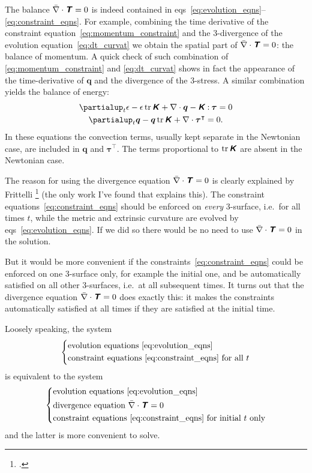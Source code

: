 \documentclass[\ifafour a4paper,12pt,\else a5paper,10pt,\fi%
onecolumn,oneside,article,%
british%
]{memoir}
\theoremstyle{remark}
\theoremstyle{innote}
\newcommand*{\mathte}[1]{\textbf{\textit{\textsf{#1}}}}
\newcommand*{\citey}{\footcites}%
\newcommand*{\de}{\partialup}%
\DeclareMathOperator{\tr}{tr}%
\newcommand*{\con}{\mathbin{:}}%
\renewcommand*{\|}[1][]{\nonscript\,#1\vert\nonscript\;\mathopen{}}
\newcommand*{\eqns}{eqs}%
\newcommand*{\ie}{{i.e.}}
\newcommand*{\T}{^\intercal}%
\newcommand*{\yTT}{\tau}
\newcommand*{\yT}{\bm{\yTT}}
\newcommand*{\yTTf}{T}
\newcommand*{\yTf}{\mathte{\yTTf}}
\newcommand*{\yKK}{K}
\newcommand*{\yK}{\mathte{\yKK}}
\newcommand*{\ypp}{q}
\newcommand*{\yp}{\bm{\ypp}}
\newcommand*{\ye}{\epsilon}
\newcommand*{\ynab}{\nabla}
\newcommand*{\ynaf}{\Bar{\nabla}}
\begin{document}
The balance $\ynaf\cdot\yTf = 0$ is indeed contained in
\eqns~\eqref{eq:evolution_eqns}--\eqref{eq:constraint_eqns}. For example,
combining the time derivative of the constraint
equation~\eqref{eq:momentum_constraint} and the 3-divergence of the
evolution equation~\eqref{eq:dt_curvat} we obtain the spatial part of
$\ynaf\cdot\yTf = 0$: the balance of momentum. A quick check of such
combination of \eqref{eq:momentum_constraint} and \eqref{eq:dt_curvat}
shows in fact the appearance of the time-derivative of $\yp$ and the
divergence of the 3-stress. A similar combination yields the balance of
energy:
\begin{subequations}\label{eq:evolution_energy_momentum}
  \begin{gather}
    \label{eq:dt_energy}
    \de_t \ye - \ye\tr\yK + \ynab\cdot\yp - \yK\con\yT =0
    \\
    \label{eq:dt_momentum}
    \de_t \yp -  \yp\tr\yK + \ynab\cdot\yT\T =0.
  \end{gather}
\end{subequations}
In these equations the convection terms, usually kept separate in the
Newtonian case, are included in $\yp$ and $\yT\T$. The terms proportional
to $\tr\yK$ are absent in the Newtonian case.

The reason for using the divergence equation $\ynaf\cdot\yTf = 0$ is
clearly explained by Frittelli \citey{frittelli1997} (the only work I've
found that explains this). The constraint
equations~\eqref{eq:constraint_eqns} should be enforced on \emph{every}
3-surface, \ie\ for all times $t$, while the metric and extrinsic curvature
are evolved by \eqns~\eqref{eq:evolution_eqns}. If we did so there would be
no need to use $\ynaf\cdot\yTf = 0$ in the solution.

But it would be more convenient if the
constraints~\eqref{eq:constraint_eqns} could be enforced on one 3-surface
only, for example the initial one, and be automatically satisfied on all
other 3-surfaces, \ie\ at all subsequent times. It turns out that the
divergence equation $\ynaf\cdot\yTf = 0$ does exactly this: it makes the
constraints automatically satisfied at all times if they are satisfied at
the initial time.

Loosely speaking, the system
\begin{equation*}
  \left\{\begin{aligned}
  &\text{evolution equations~\eqref{eq:evolution_eqns}} \\
  &\text{constraint equations~\eqref{eq:constraint_eqns} for all $t$}
  \end{aligned}\right.
\end{equation*}
is equivalent to the system
\begin{equation*}
  \left\{\begin{aligned}
  &\text{evolution equations~\eqref{eq:evolution_eqns}} \\
  &\text{divergence equation $\ynaf\cdot\yTf = 0$} \\
  &\text{constraint equations~\eqref{eq:constraint_eqns} for initial $t$ only}
  \end{aligned}\right.
\end{equation*}
and the latter is more convenient to solve.
\end{document}
